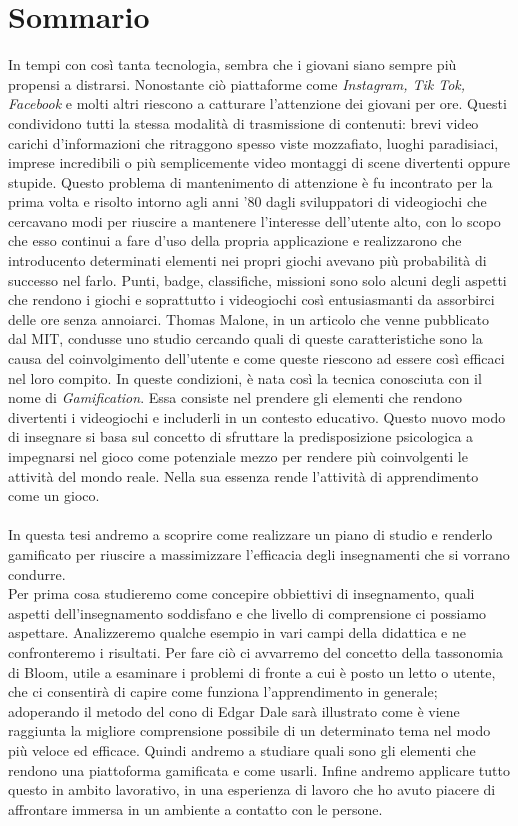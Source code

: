 \chapter*{Sommario}
\label{sommario}


In tempi con così tanta tecnologia, sembra che i giovani siano sempre più propensi a distrarsi. Nonostante ciò piattaforme come \textit{Instagram, Tik Tok, Facebook} e molti altri riescono a catturare l'attenzione dei giovani per ore. Questi condividono tutti la stessa modalità di trasmissione di contenuti: brevi video carichi d'informazioni che ritraggono spesso viste mozzafiato, luoghi paradisiaci, imprese incredibili o più semplicemente video montaggi di scene divertenti oppure stupide.
Questo problema di mantenimento di attenzione è fu incontrato per la prima volta e risolto intorno agli anni '80 dagli sviluppatori di videogiochi che cercavano modi per riuscire a mantenere l'interesse dell'utente alto, con lo scopo che esso continui a fare d'uso della propria applicazione e realizzarono che introducento determinati elementi nei propri giochi avevano più probabilità di successo nel farlo. Punti, badge, classifiche, missioni sono solo alcuni degli aspetti che rendono i giochi e soprattutto i videogiochi così entusiasmanti da assorbirci delle ore senza annoiarci.
Thomas Malone, in un articolo che venne pubblicato dal MIT, condusse uno studio cercando quali di queste caratteristiche sono la causa del coinvolgimento dell'utente e come queste riescono ad essere così efficaci nel loro compito. In queste condizioni, è nata così la tecnica conosciuta con il nome di \textit{Gamification}. Essa consiste nel prendere gli elementi che rendono divertenti i videogiochi e includerli in un contesto educativo. Questo nuovo modo di insegnare si basa sul concetto di sfruttare la predisposizione psicologica a impegnarsi nel gioco come potenziale mezzo per rendere più coinvolgenti le attività del mondo reale. Nella sua essenza rende l'attività di apprendimento come un gioco.\\
\\
In questa tesi andremo a scoprire come realizzare un piano di studio e renderlo gamificato per riuscire a massimizzare l'efficacia degli insegnamenti che si vorrano condurre.\\
Per prima cosa studieremo come concepire obbiettivi di insegnamento, quali aspetti dell'insegnamento soddisfano e che livello di comprensione ci possiamo aspettare. Analizzeremo qualche esempio in vari campi della didattica e ne confronteremo i risultati. Per fare ciò ci avvarremo del concetto della tassonomia di Bloom, utile a esaminare i problemi di fronte a cui è posto un letto o utente, che ci consentirà di capire come funziona l'apprendimento in generale; adoperando il metodo del cono di Edgar Dale sarà illustrato come è viene raggiunta la migliore comprensione possibile di un determinato tema nel modo più veloce ed efficace. Quindi andremo a studiare quali sono gli elementi che rendono una piattoforma gamificata e come usarli. Infine andremo applicare tutto questo in ambito lavorativo, in una esperienza di lavoro che ho avuto piacere di affrontare immersa in un ambiente a contatto con le persone. 
